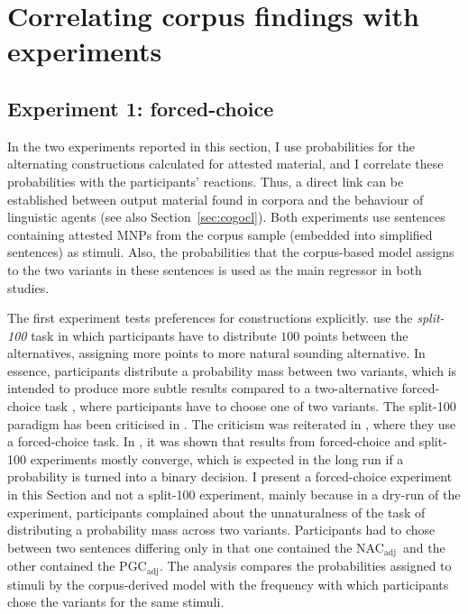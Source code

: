 \documentclass[USenglish]{article}
\newcommand{\Sub}[1]{\ensuremath{\mathrm{_{#1}}}}
\newcommand{\NACa}{NAC\Sub{adj}}
\newcommand{\PGCa}{PGC\Sub{adj}}
\begin{document}


\section{Correlating corpus findings with experiments}
\label{sec:experimental}

\subsection{Experiment 1: forced-choice}
\label{sec:exp:fc}

In the two experiments reported in this section, I use probabilities for the alternating constructions calculated for attested material, and I correlate these probabilities with the participants' reactions.
Thus, a direct link can be established between output material found in corpora and the behaviour of linguistic agents (see also Section~\ref{sec:cogocl}).
Both experiments use sentences containing attested MNPs from the corpus sample (embedded into simplified sentences) as stimuli.
Also, the probabilities that the corpus-based model assigns to the two variants in these sentences is used as the main regressor in both studies.

The first experiment tests preferences for constructions explicitly.
\cite{FordBresnan2013} use the \textit{split-100} task in which participants have to distribute $100$ points between the alternatives, assigning more points to more natural sounding alternative.
In essence, participants distribute a probability mass between two variants, which is intended to produce more subtle results compared to a two-alternative forced-choice task \citep{Rosenbach2013}, where participants have to choose one of two variants.
The split-100 paradigm has been criticised in \cite{ArppeJaervikivi2007}.
The criticism was reiterated in \cite{DivjakEa2016}, where they use a forced-choice task.
In \cite{VerhoevenTemme2017}, it was shown that results from forced-choice and split-100 experiments mostly converge, which is expected in the long run if a probability is turned into a binary decision.
I present a forced-choice experiment in this Section and not a split-100 experiment, mainly because in a dry-run of the experiment, participants complained about the unnaturalness of the task of distributing a probability mass across two variants.
Participants had to chose between two sentences differing only in that one contained the \NACa\ and the other contained the \PGCa.
The analysis compares the probabilities assigned to stimuli by the corpus-derived model with the frequency with which participants chose the variants for the same stimuli.
\end{document}
